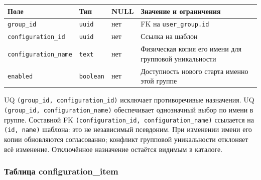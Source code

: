\documentclass[12pt,a4paper]{article}
\newcounter{none} %
\begin{document}
\hypertarget{таблица-user_group_problem_configuration}{}

{\def\LTcaptype{none} %
\begin{longtable}[]{@{}
  >{\raggedright\arraybackslash}p{}
  >{\raggedright\arraybackslash}p{}
  >{\raggedright\arraybackslash}p{}
  >{\raggedright\arraybackslash}p{}@{}}
\toprule\noalign{}
\begin{minipage}[b]{\linewidth}\raggedright
Поле
\end{minipage} & \begin{minipage}[b]{\linewidth}\raggedright
Тип
\end{minipage} & \begin{minipage}[b]{\linewidth}\raggedright
NULL
\end{minipage} & \begin{minipage}[b]{\linewidth}\raggedright
Значение и ограничения
\end{minipage} \\
\midrule\noalign{}
\endhead
\bottomrule\noalign{}
\endlastfoot
\texttt{group\_id} & \texttt{uuid} & нет & FK на \texttt{user\_\allowbreak{}group.\allowbreak{}id} \\
\texttt{configuration\_\allowbreak{}id} & \texttt{uuid} & нет & Ссылка на шаблон \\
\texttt{configuration\_\allowbreak{}name} & \texttt{text} & нет & Физическая копия его имени для групповой уникальности \\
\texttt{enabled} & \texttt{boolean} & нет & Доступность нового старта именно этой группе \\
\end{longtable}
}

UQ \texttt{(group\_\allowbreak{}id, configuration\_\allowbreak{}id)} исключает противоречивые назначения. UQ \texttt{(group\_\allowbreak{}id, configuration\_\allowbreak{}name)} обеспечивает однозначный выбор по имени в группе. Составной FK \texttt{(configuration\_\allowbreak{}id, configuration\_\allowbreak{}name)} ссылается на \texttt{(id,\ name)} шаблона: это не независимый псевдоним. При изменении имени его копии обновляются согласованно; конфликт групповой уникальности отклоняет всё изменение. Отключённое назначение остаётся видимым в каталоге.

\subsubsection{Таблица configuration\_item}\label{ux442ux430ux431ux43bux438ux446ux430-configuration_item}
\end{document}
